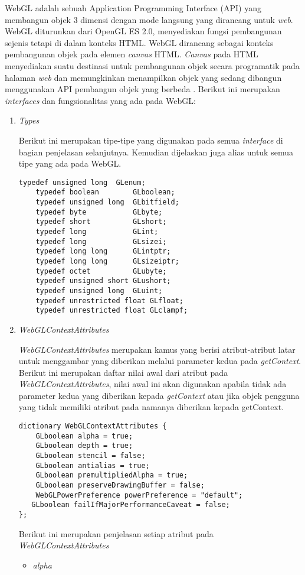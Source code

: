 WebGL adalah sebuah Application Programming Interface (API) yang membangun objek 3 dimensi dengan mode langsung yang dirancang untuk {\it web}. WebGL diturunkan dari OpenGL ES 2.0, menyediakan fungsi pembangunan sejenis tetapi di dalam konteks HTML. WebGL dirancang sebagai konteks pembangunan objek pada elemen {\it canvas} HTML. {\it Canvas} pada HTML menyediakan suatu destinasi untuk pembangunan objek secara programatik pada halaman {\it web} dan memungkinkan menampilkan objek yang sedang dibangun menggunakan API pembangun objek yang berbeda \cite{webgl}. Berikut ini merupakan {\it interfaces} dan fungsionalitas yang ada pada WebGL:
\begin{enumerate}
\item {\it Types}

	Berikut ini merupakan tipe-tipe yang digunakan pada semua {\it interface} di bagian penjelasan selanjutnya. Kemudian dijelaskan juga alias untuk semua tipe yang ada pada WebGL.
	\begin{lstlisting}[caption={type yang serupa hehe}, captionpos=b]
	typedef unsigned long  GLenum;
	typedef boolean        GLboolean;
	typedef unsigned long  GLbitfield;
	typedef byte           GLbyte;
	typedef short          GLshort;
	typedef long           GLint;
	typedef long           GLsizei;
	typedef long long      GLintptr;
	typedef long long      GLsizeiptr;
	typedef octet          GLubyte;
	typedef unsigned short GLushort;
	typedef unsigned long  GLuint;
	typedef unrestricted float GLfloat;
	typedef unrestricted float GLclampf;
	\end{lstlisting}
	
\item {\it WebGLContextAttributes}

	{\it WebGLContextAttributes} merupakan kamus yang berisi atribut-atribut latar untuk menggambar yang diberikan melalui parameter kedua pada {\it getContext}. Berikut ini merupakan daftar nilai awal dari atribut pada {\it WebGLContextAttributes}, nilai awal ini akan digunakan apabila tidak ada parameter kedua yang diberikan kepada {\it getContext} atau jika objek pengguna yang tidak memiliki atribut pada namanya diberikan kepada getContext.
	\begin{lstlisting}
dictionary WebGLContextAttributes {
    GLboolean alpha = true;
    GLboolean depth = true;
    GLboolean stencil = false;
    GLboolean antialias = true;
    GLboolean premultipliedAlpha = true;
    GLboolean preserveDrawingBuffer = false;
    WebGLPowerPreference powerPreference = "default";
   GLboolean failIfMajorPerformanceCaveat = false;
};
	\end{lstlisting}
	Berikut ini merupakan penjelasan setiap atribut pada {\it WebGLContextAttributes} 
	\begin{itemize}
	\item {\it alpha}
	

\end{itemize}
\end{enumerate}

